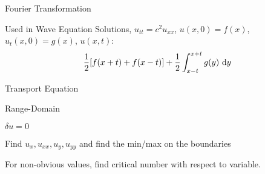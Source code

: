 \documentclass{article}
\begin{document}
\begin{multicols}{2}

  {Fourier Transformation}


  Used in Wave Equation Solutions, $u_{tt} = c^2 u_{xx}$, $u(x, 0) = f(x)$, $u_t(x, 0) = g(x)$, $u(x, t)$:
  \begin{align}
    \frac{1}{2} [f(x + t) + f(x - t)] + \frac{1}{2} \int^{x + t}_{x - t} g(y)\ \text dy
  \end{align}


  {Transport Equation}


  {Range-Domain}


  $\delta u = 0$

  Find $u_x, u_{xx}, u_y, u_{yy}$ and find the min/max on the boundaries

  For non-obvious values, find critical number with respect to variable.
\end{multicols}
\end{document}
